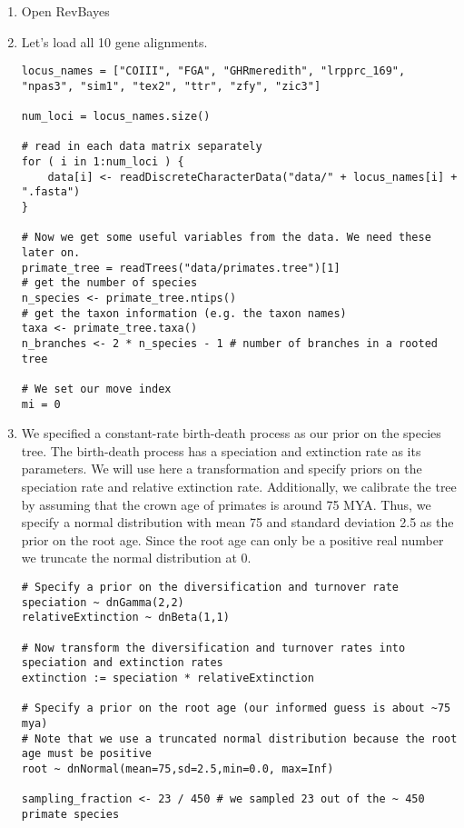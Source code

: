 \begin{enumerate}
\item Open RevBayes
\item Let's load all 10 gene alignments.
{\tt \begin{snugshade*}
\begin{lstlisting}
locus_names = ["COIII", "FGA", "GHRmeredith", "lrpprc_169", "npas3", "sim1", "tex2", "ttr", "zfy", "zic3"]

num_loci = locus_names.size()

# read in each data matrix separately
for ( i in 1:num_loci ) {
    data[i] <- readDiscreteCharacterData("data/" + locus_names[i] + ".fasta")
}

# Now we get some useful variables from the data. We need these later on.
primate_tree = readTrees("data/primates.tree")[1]
# get the number of species
n_species <- primate_tree.ntips()
# get the taxon information (e.g. the taxon names)
taxa <- primate_tree.taxa()
n_branches <- 2 * n_species - 1 # number of branches in a rooted tree

# We set our move index
mi = 0
\end{lstlisting}
\end{snugshade*}}
\item We specified a constant-rate birth-death process as our prior on the species tree. 
The birth-death process has a speciation and extinction rate as its parameters. 
We will use here a transformation and specify priors on the speciation rate and relative extinction rate.
Additionally, we calibrate the tree by assuming that the crown age of primates is around 75 MYA.
Thus, we specify a normal distribution with mean 75 and standard deviation 2.5 as the prior on the root age.
Since the root age can only be a positive real number we truncate the normal distribution at 0.
{\tt \begin{snugshade*}
\begin{lstlisting}
# Specify a prior on the diversification and turnover rate
speciation ~ dnGamma(2,2)
relativeExtinction ~ dnBeta(1,1)

# Now transform the diversification and turnover rates into speciation and extinction rates
extinction := speciation * relativeExtinction

# Specify a prior on the root age (our informed guess is about ~75 mya)
# Note that we use a truncated normal distribution because the root age must be positive
root ~ dnNormal(mean=75,sd=2.5,min=0.0, max=Inf)

sampling_fraction <- 23 / 450 # we sampled 23 out of the ~ 450 primate species


\end{lstlisting}
\end{snugshade*}}
\end{enumerate}
